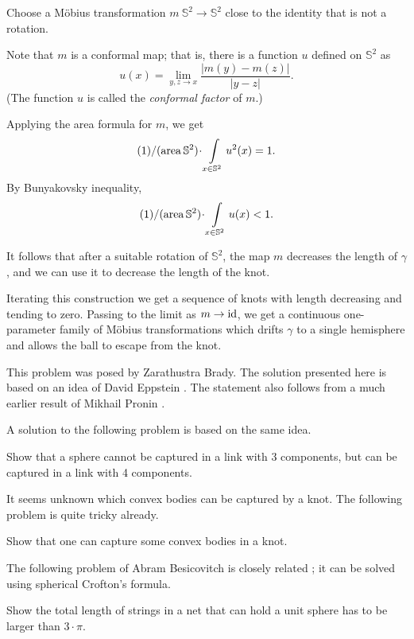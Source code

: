 Choose a Möbius transformation 
$m\:\mathbb{S}^2\to\mathbb{S}^2$ close to the identity that is not a rotation.

Note that $m$ is a conformal map;
that is, there is a function $u$ defined on $\mathbb{S}^2$ 
as 
\[u(x)=\lim_{y,z\to x}\frac{|m(y)-m(z)|}{|y-z|}.\]
(The function $u$ is called the \emph{conformal factor} of $m$.)

Applying the area formula for $m$,
we get 
$$\frac1{\area \mathbb{S}^2}\cdot\int\limits_{x\in\mathbb{S}^2} u^2(x)=1.$$
By Bunyakovsky inequality, 
$$\frac1{\area \mathbb{S}^2}\cdot\int\limits_{x\in\mathbb{S}^2} u(x)<1.$$

It follows that after a suitable rotation of $\mathbb{S}^2$, 
the map $m$ decreases the length of $\gamma$, and we can use it to decrease the length of the knot.

Iterating this construction we get a sequence of knots with length decreasing and tending to zero.
Passing to the limit as $m\to\operatorname{\rm id}$, we get a continuous one-parameter family of Möbius transformations which drifts $\gamma$ to a single hemisphere and allows the ball to escape from the knot.
\qeds

This problem was posed by Zarathustra Brady.
The solution presented here is based on an idea of David Eppstein \cite{zeb}.
The statement also follows from a much earlier result of Mikhail Pronin \cite{pronin}.

A solution to the following problem is based on the same idea.

\begin{pr}
Show that a sphere cannot be captured in a link with 3 components, but can be captured in a link with 4 components.
\end{pr}

It seems unknown which convex bodies can be captured by a knot.
The following problem is quite tricky already.

\begin{pr}
Show that one can capture some convex bodies in a knot.
\end{pr}

The following problem of Abram Besicovitch is closely related \cite{besicovitch-sphere}; it can be solved using spherical Crofton's formula.

\begin{pr}
Show the total length of strings in a net that can hold a unit sphere has to be larger than $3\cdot\pi$.
\end{pr}






